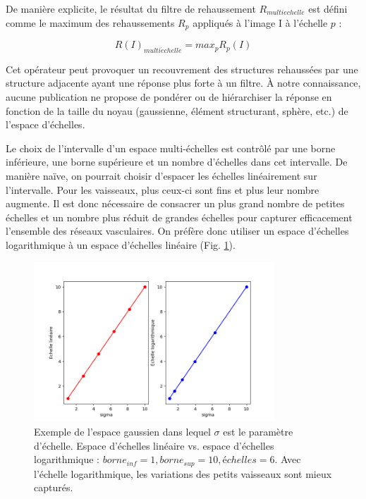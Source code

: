   De manière explicite, le résultat du filtre de rehaussement $R_{multi echelle}$ est défini comme le maximum des rehaussements $R_{p}$ appliqués à l'image I à l'échelle $p$ :
  
  \begin{equation}
    R(I)_{multi \acute echelle} = max_{p}R_{p}(I) 
  \end{equation}

  
  Cet opérateur peut provoquer un recouvrement des structures rehaussées par une structure adjacente ayant une réponse plus forte à un filtre. À notre connaissance, aucune publication ne propose de pondérer ou de hiérarchiser la réponse en fonction de la taille du noyau (gaussienne, élément structurant, sphère, etc.) de l'espace d'échelles.

  Le choix de l'intervalle d'un espace multi-échelles est contrôlé par une borne inférieure, une borne supérieure et un nombre d'échelles dans cet intervalle. De manière naïve, on pourrait choisir d'espacer les échelles linéairement sur l'intervalle. Pour les vaisseaux, plus ceux-ci sont fins et plus leur nombre augmente. Il est donc nécessaire de consacrer un plus grand nombre de petites échelles  et un nombre plus réduit de grandes échelles pour capturer efficacement l'ensemble des réseaux vasculaires. On préfère donc utiliser un espace d'échelles logarithmique à un espace d'échelles linéaire (Fig. \ref{fig:scale_space}).

  \begin{figure}[!ht]
    \centering
    \includegraphics[height=6cm]{Images/scale_space.png}
    \caption{Exemple de l'espace gaussien dans lequel $\sigma$ est le paramètre d'échelle. Espace d'échelles linéaire vs. espace d'échelles logarithmique : $borne_{inf}=1,borne_{sup}=10,échelles=6$. Avec l'échelle logarithmique, les variations des petits vaisseaux sont mieux capturés.}
    \label{fig:scale_space}
  \end{figure}


